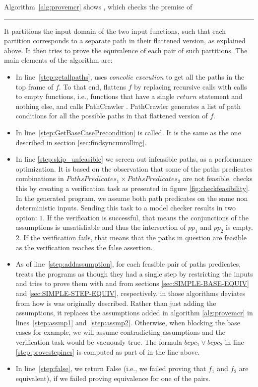 Algorithm~\ref{alg:provemcr} shows 
, which checks the premise of \rule{MRC-PART-EQ}. It partitions the input domain of the two input functions, such that each partition corresponds to a separate path in their flattened version, as explained above. It then tries to prove the equivalence of each pair of such partitions. The main elements of the algorithm are: 
\begin{itemize}
    \item In line~\ref{step:getallpaths},
     uses \emph{concolic execution} to get all the paths in the top frame of $f$. To that end,  flattens $f$ by replacing recursive calls with calls to empty functions, i.e., functions that have a single $return$ statement and nothing else, and calls PathCrawler \cite{10.1007/11408901_21}. PathCrawler generates a list of path conditions for all the possible paths in that flattened version of $f$.  
    \item In line~\ref{step:GetBaseCasePrecondition}  is called. It is the same as the one described in section \ref{sec:findsyncunrolling}.
    \item In line \ref{step:skip_unfeasible} we screen out infeasible paths, as a performance optimization. It is based on the observation that some of the paths predicates combinations in $PathsPredicates_1 \times PathsPredicates_2$ are not feasible.  checks this by creating a verification task as presented in figure \ref{fig:checkfeasibility}. In the generated program, we assume both path predicates on the same non deterministic inputs. Sending this task to a model checker results in two option: $1.$ If the verification is successful, that means the conjunctions of the assumptions is unsatisfiable and thus the intersection of $pp_1$ and $pp_2$ is empty. $2.$ If the verification fails, that means that the paths in question are feasible as the verification reaches the false assertion.
    
    \item As of line~\ref{step:addassumption}, for each feasible pair of paths predicates,  treats the programs as though they had a single step by restricting the inputs and tries to prove them with  and  from sections \ref{sec:SIMPLE-BASE-EQUIV} and \ref{sec:SIMPLE-STEP-EQUIV}, respectively.  in those algorithms deviates from how is was originally described. Rather than just adding the assumptions, it replaces the assumptions added in algorithm \ref{alg:provemcr} in lines~\ref{step:assmp1} and~\ref{step:assmp2}. Otherwise, when blocking the base cases for example, we will assume contradicting assumptions and the verification task would be vacuously true. The formula $bcpc_1\lor bcpc_2$ in line \ref{step:provestepincs} is computed as part of   in the line above. 
    
    \item In line~\ref{step:false}, we return False (i.e., we failed proving that $f_1$ and $f_2$ are equivalent), if we failed proving equivalence for one of the pairs. 
\end{itemize}

